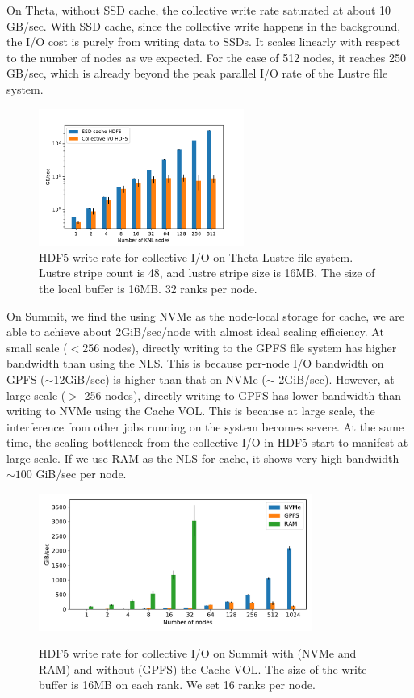 \documentclass[aps, prb, 11pt, notitlepage]{revtex4-1}
\begin{document}
On Theta, without SSD cache, the collective write rate saturated at about 10 GB/sec. With SSD cache, since the collective write happens in the background, the I/O cost is purely from writing data to SSDs. It scales linearly with respect to the number of nodes as we expected. For the case of 512 nodes, it reaches 250 GB/sec, which is already beyond the peak parallel I/O rate of the Lustre file system. 
\begin{figure}[hbt]
\centering
\includegraphics[width=0.6\textwidth]{ssd_cache.pdf}
\caption{HDF5 write rate for collective I/O on Theta Lustre file system. Lustre stripe count is 48, and lustre stripe size is 16MB. The size of the local buffer is 16MB. 32 ranks per node.}\label{fig:theta_perf}
\end{figure}

On Summit, we find the using NVMe as the node-local storage for cache, we are able to achieve about 2GiB/sec/node with almost ideal scaling efficiency. At small scale ($<$256 nodes), directly writing to the GPFS file system has higher bandwidth than using the NLS. This is because per-node I/O bandwidth on GPFS ($\sim 12$GiB/sec) is higher than that on NVMe ($\sim$ 2GiB/sec). However, at large scale ($>$ 256 nodes), directly writing to GPFS has lower bandwidth than writing to NVMe using the Cache VOL. This is because at large scale, the interference from other jobs running on the system becomes severe. At the same time, the scaling bottleneck from the collective I/O in HDF5 start to manifest at large scale. If we use RAM as the NLS for cache, it shows very high bandwidth $\sim 100$ GiB/sec per node. 
\begin{figure}[hbt]
\centering
\includegraphics[width=0.8\textwidth]{summit_cache_vol.pdf}\label{sec:summit_perf}
\caption{HDF5 write rate for collective I/O on Summit with (NVMe and RAM) and without (GPFS) the Cache VOL. The size of the write buffer is 16MB on each rank. We set 16 ranks per node.}\label{fig:summit_perf}
\end{figure}
\end{document}

